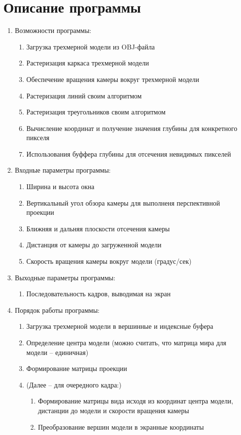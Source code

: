 \documentclass[14pt,a4paper,report]{report}
\begin{document}
\section{Описание программы}
\begin{enumerate}
\item Возможности программы:

\begin{enumerate}
\item Загрузка трехмерной модели из OBJ-файла
\item Растеризация каркаса трехмерной модели
\item Обеспечение вращения камеры вокруг трехмерной модели
\item Растеризация линий своим алгоритмом
\item Растеризация треугольников своим алгоритмом
\item Вычисление координат и получение значения глубины для конкретного пикселя
\item Использования буффера глубины для отсечения невидимых пикселей
\end{enumerate}

\item Входные параметры программы:

\begin{enumerate}
\item Ширина и высота окна
\item Вертикальный угол обзора камеры для выполненя перспективной проекции
\item Ближняя и дальняя плоскости отсечения камеры
\item Дистанция от камеры до загруженной модели
\item Скорость вращения камеры вокруг модели (градус/сек)
\end{enumerate}

\item Выходные параметры программы:

\begin{enumerate}
\item Последовательность кадров, выводимая на экран
\end{enumerate}
\item Порядок работы программы:
\begin{enumerate}
\item Загрузка трехмерной модели в вершинные и индексные буфера
\item Определение центра модели (можно считать, что матрица мира для модели – единичная)
\item Формирование матрицы проекции
\item (Далее – для очередного кадра:)
\begin{enumerate}
\item Формирование матрицы вида исходя из координат центра модели, дистанции до модели и скорости вращения камеры
\item Преобразование вершин модели в экранные координаты 
\end{enumerate}



\end{enumerate}

\end{enumerate}
\end{document}
